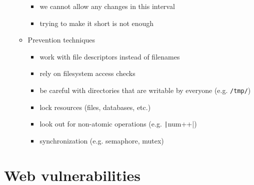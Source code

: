 \documentclass[final]{article}
\begin{document}
\begin{itemize}[nosep]
\begin{itemize}
\begin{itemize}[nosep]
                        \item we cannot allow any changes in this interval
                        \item trying to make it short is not enough
                    \end{itemize}
              \item Prevention techniques
                    \begin{itemize}[nosep]
                        \item work with file descriptors instead of filenames
                        \item rely on filesystem access checks
                        \item be careful with directories that are writable by everyone (e.g. \texttt{/tmp/})
                        \item lock resources (files, databases, etc.)
                        \item look out for non-atomic operations (e.g. \texttt|num++|)
                        \item synchronization (e.g. semaphore, mutex)
                    \end{itemize}
          \end{itemize}
\end{itemize}
\section{Web vulnerabilities}
\end{document}
